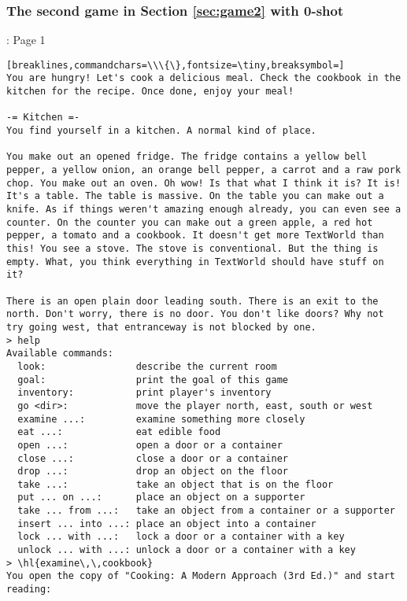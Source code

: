 \subsubsection{The second game in Section \ref{sec:game2} with 0-shot}\label{sec:game2_log}

\begin{AIbox}[width=0.9\textwidth]{\DV: Page 1}
\begin{Verbatim}[breaklines,commandchars=\\\{\},fontsize=\tiny,breaksymbol=]
You are hungry! Let's cook a delicious meal. Check the cookbook in the kitchen for the recipe. Once done, enjoy your meal!

-= Kitchen =-
You find yourself in a kitchen. A normal kind of place.

You make out an opened fridge. The fridge contains a yellow bell pepper, a yellow onion, an orange bell pepper, a carrot and a raw pork chop. You make out an oven. Oh wow! Is that what I think it is? It is! It's a table. The table is massive. On the table you can make out a knife. As if things weren't amazing enough already, you can even see a counter. On the counter you can make out a green apple, a red hot pepper, a tomato and a cookbook. It doesn't get more TextWorld than this! You see a stove. The stove is conventional. But the thing is empty. What, you think everything in TextWorld should have stuff on it?

There is an open plain door leading south. There is an exit to the north. Don't worry, there is no door. You don't like doors? Why not try going west, that entranceway is not blocked by one.
> help
Available commands:
  look:                describe the current room
  goal:                print the goal of this game
  inventory:           print player's inventory
  go <dir>:            move the player north, east, south or west
  examine ...:         examine something more closely
  eat ...:             eat edible food
  open ...:            open a door or a container
  close ...:           close a door or a container
  drop ...:            drop an object on the floor
  take ...:            take an object that is on the floor
  put ... on ...:      place an object on a supporter
  take ... from ...:   take an object from a container or a supporter
  insert ... into ...: place an object into a container
  lock ... with ...:   lock a door or a container with a key
  unlock ... with ...: unlock a door or a container with a key
> \hl{examine\,\,cookbook}
You open the copy of "Cooking: A Modern Approach (3rd Ed.)" and start reading:


\end{Verbatim}
\end{AIbox}
